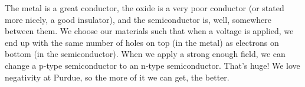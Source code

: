 \documentclass[nobib]{tufte-handout}
\begin{document}
The metal is a great conductor, the oxide is a very poor conductor (or stated more nicely, a good insulator), and the semiconductor 
is, well, somewhere between them. We choose our materials such that when a voltage is applied, 
we end up with the same number of holes on top (in the metal) as electrons on bottom (in the semiconductor). 
When we apply a strong enough field, we can change a p-type semiconductor to an n-type semiconductor. 
That's huge! We love negativity at Purdue, so the more of it we can get, the better. 
\end{document}
